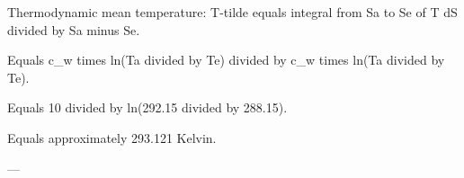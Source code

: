 Thermodynamic mean temperature:  
T-tilde equals integral from Sa to Se of T dS divided by Sa minus Se.  

Equals c_w times ln(Ta divided by Te) divided by c_w times ln(Ta divided by Te).  

Equals 10 divided by ln(292.15 divided by 288.15).  

Equals approximately 293.121 Kelvin.  

---